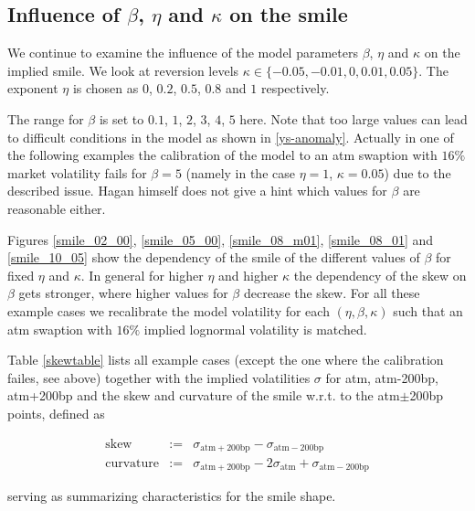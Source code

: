 \documentclass{amsart}
\theoremstyle{plain}
\numberwithin{equation}{section}
\begin{document}
\subsection{Influence of $\beta$, $\eta$ and $\kappa$ on the smile}

We continue to examine the influence of the model parameters $\beta$, $\eta$ and $\kappa$ on the implied smile. We look at reversion levels $\kappa \in \{ -0.05, -0.01, 0, 0.01 ,0.05 \}$. The exponent $\eta$ is chosen as $0$, $0.2$, $0.5$, $0.8$ and $1$ respectively. 

The range for $\beta$ is set to $0.1$, $1$, $2$, $3$, $4$, $5$ here. Note that too large values can lead to difficult conditions in the model as shown in \ref{ys-anomaly}. Actually in one of the following examples the calibration of the model to an atm swaption with $16\%$ market volatility fails for $\beta=5$ (namely in the case $\eta=1$, $\kappa=0.05$) due to the described issue. Hagan himself does not give a hint which values for $\beta$ are reasonable either.

Figures \ref{smile_02_00}, \ref{smile_05_00}, \ref{smile_08_m01}, \ref{smile_08_01} and \ref{smile_10_05} show the dependency of the smile of the different values of $\beta$ for fixed $\eta$ and $\kappa$. In general for higher $\eta$ and higher $\kappa$ the dependency of the skew on $\beta$ gets stronger, where higher values for $\beta$ decrease the skew. For all these example cases we recalibrate the model volatility for each $(\eta,\beta,\kappa)$ such that an atm swaption with $16\%$ implied lognormal volatility is matched.

Table \ref{skewtable} lists all example cases (except the one where the calibration failes, see above) together with the implied volatilities $\sigma$ for atm, atm-200bp, atm+200bp and the skew and curvature of the smile w.r.t. to the atm$\pm$200bp points, defined as

\begin{eqnarray}
\text{skew} & := & \sigma_{\text{atm}+200\text{bp}} - \sigma_{\text{atm}-200\text{bp}} \\
\text{curvature} & := & \sigma_{\text{atm}+200\text{bp}} -2\sigma_{\text{atm}} + \sigma_{\text{atm}-200\text{bp}}
\end{eqnarray}

serving as summarizing characteristics for the smile shape.
\end{document}
